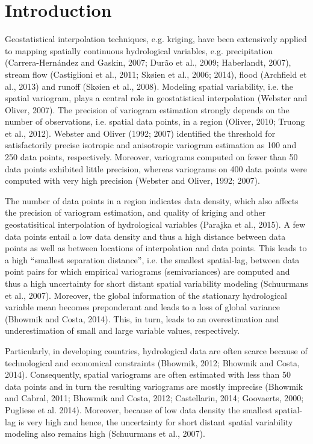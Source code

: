 \newpage

\section{Introduction}
\label{introduction}

Geostatistical interpolation techniques, e.g. kriging, have been extensively applied to mapping spatially continuous hydrological variables, e.g. precipitation (Carrera-Hernández and Gaskin, 2007; Durão et al., 2009; Haberlandt, 2007), stream flow (Castiglioni et al., 2011; Skøien et al., 2006; 2014), flood (Archfield et al., 2013) and runoff (Skøien et al., 2008). Modeling spatial variability, i.e. the spatial variogram, plays a central role in geostatistical interpolation (Webster and Oliver, 2007). The precision of variogram estimation strongly depends on the number of observations, i.e. spatial data points, in a region (Oliver, 2010; Truong et al., 2012). Webster and Oliver (1992; 2007) identified the threshold for satisfactorily precise isotropic and anisotropic variogram estimation as 100 and 250 data points, respectively. Moreover, variograms computed on fewer than 50 data points exhibited little precision, whereas variograms on 400 data points were computed with very high precision  (Webster and Oliver, 1992; 2007).

The number of data points in a region indicates data density, which also affects the precision of variogram estimation, and quality of kriging and other geostatisitical interpolation of hydrological variables (Parajka et al., 2015). A few data points entail a low data density and thus a high distance between data points as well as between locations of interpolation and data points. This leads to a high “smallest separation distance”, i.e. the smallest spatial-lag, between data point pairs for which empirical variograms (semivariances) are computed and thus a high uncertainty for short distant spatial variability modeling (Schuurmans et al., 2007). Moreover, the global information of the stationary hydrological variable mean becomes preponderant and leads to a loss of global variance (Bhowmik and Costa, 2014). This, in turn, leads to an overestimation and underestimation of small and large variable values, respectively.

Particularly, in developing countries, hydrological data are often scarce because of technological and economical constraints (Bhowmik, 2012; Bhowmik and Costa, 2014). Consequently, spatial variograms are often estimated with less than 50 data points and in turn the resulting variograms are mostly imprecise (Bhowmik and Cabral, 2011; Bhowmik and Costa, 2012; Castellarin, 2014; Goovaerts, 2000; Pugliese et al. 2014). Moreover, because of low data density the smallest spatial-lag is very high and hence, the uncertainty for short distant spatial variability modeling also remains high (Schuurmans et al., 2007). 

